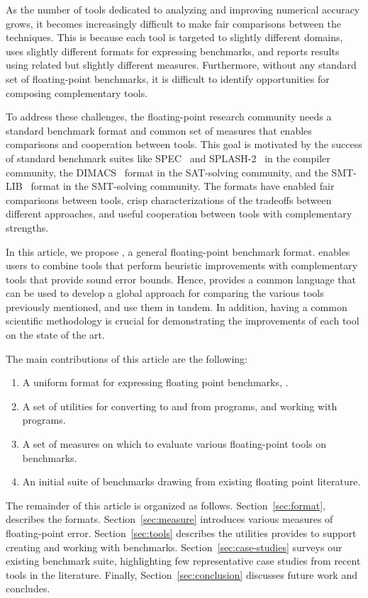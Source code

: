\documentclass[main.tex]{subfiles}
\begin{document}
As the number of tools dedicated to analyzing and improving numerical
accuracy grows, it becomes increasingly difficult to make fair
comparisons between the techniques.  This is because each tool is targeted
to slightly different domains, uses slightly different formats for
expressing benchmarks, and reports results using related but slightly
different measures.  Furthermore, without any standard set of floating-point
benchmarks, it is difficult to identify opportunities for composing
complementary tools.

To address these challenges, the floating-point research community needs a
standard benchmark format and common set of measures that enables
comparisons and cooperation between tools.  This goal is motivated by the
success of standard benchmark suites like SPEC~\cite{spec} and
SPLASH-2~\cite{splash} in
the compiler community, the DIMACS~\cite{dimacs} format in the SAT-solving
community, and the SMT-LIB~\cite{smtlib} format in the SMT-solving community.
The formats have enabled fair comparisons between tools, crisp
characterizations of the tradeoffs between different approaches, and useful
cooperation between tools with complementary strengths.

In this article, we propose \name, a general floating-point benchmark
format. \name enables users to combine tools that perform heuristic
improvements with complementary tools that provide sound error bounds.
Hence, \name provides a common language that can be used to develop
a global approach for comparing the various tools previously mentioned,
and use them in tandem. In addition, having a common scientific methodology
is crucial for demonstrating the improvements of each tool on the state
of the art.

The main contributions of this article are the following:
\begin{enumerate}[label=(\roman*)]
%
\item A uniform format for expressing floating point benchmarks, \core.
%
\item A set of utilities for converting to and from \core programs, and
  working with \core programs.
%
\item A set of measures on which to evaluate various floating-point tools
  on \name benchmarks.
%
\item An initial suite of benchmarks drawing from existing floating point
  literature.
%
\end{enumerate}

The remainder of this article is organized as follows.
Section~\ref{sec:format}, describes the \name formats.
Section~\ref{sec:measure} introduces various measures of floating-point
error.  Section~\ref{sec:tools} describes the utilities \name provides to
support creating and working with benchmarks.
Section~\ref{sec:case-studies} surveys our existing benchmark suite,
highlighting few representative case studies from recent tools in the
literature.  Finally, Section~\ref{sec:conclusion} discusses future work
and concludes.
\end{document}

